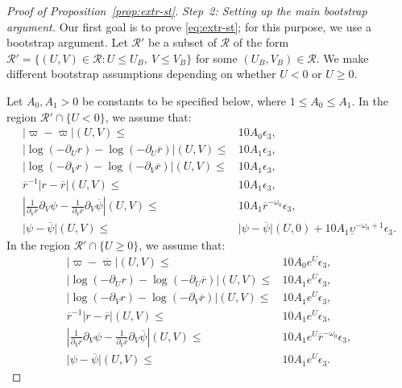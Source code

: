 \documentclass[10pt, reqno]{amsart}
\theoremstyle{definition}
\theoremstyle{remark}
\theoremstyle{conjecture}
\numberwithin{equation}{section}
\newcommand{\abs}[1]{\vert#1\vert}
\newcommand{\set}[1]{\{#1\}}
\newcommand{\rd}{\partial}
\newcommand{\0}{\emptyset}
\newcommand{\eps}{\epsilon}
\newcommand{\omg}{\omega}
\newcommand{\ups}{\upsilon}
\newcommand{\calR}{\mathcal R}
\newcommand{\pfstep}[1]{\vspace{.5em} {\it \noindent #1.}}
\newcommand{\psibg}{\overline{\psi}}				%
\newcommand{\rbg}{\overline{r}}					%
\newcommand{\varpibg}{\overline{\varpi}}				%
\newcommand{\Abs}[1]{\left\vert #1 \right\vert}
\begin{document}
\begin{proof}[Proof of Proposition~\ref{prop:extr-st}]
\pfstep{Step~2: Setting up the main bootstrap argument}
Our first goal is to prove \eqref{eq:extr-st}; for this purpose, we use a bootstrap argument. Let $\calR'$ be a subset of $\calR$ of the form $\calR' = \set{(U, V) \in \calR : U \leq U_{B}, \ V \leq V_{B}}$ for some $(U_{B}, V_{B}) \in \calR$. We make different bootstrap assumptions depending on whether $U < 0$ or $U \geq 0$. 

Let $A_{0}, A_{1} > 0$ be constants to be specified below, where $1 \leq A_{0} \leq A_{1}$. 
In the region $\calR' \cap \set{U < 0}$, we assume that:
\begin{align} 
	\abs{\varpi - \varpibg} (U, V) \leq & 10 A_{0} \eps_{3} , \label{eq:extr-st:btstrp:mdf-far} \\
	\Abs{\log (-\rd_{U} r) - \log (-\rd_{U} \rbg)} (U, V) \leq & 10 A_{1} \eps_{3} , \label{eq:extr-st:btstrp:durdf-far}\\
	\Abs{\log (-\rd_{V} r) - \log (-\rd_{V} \rbg)} (U, V) \leq & 10 A_{1} \eps_{3} , \label{eq:extr-st:btstrp:dvrdf-far}\\
	\rbg^{-1} \abs{r - \rbg} (U, V) \leq & 10 A_{1} \eps_{3} , \label{eq:extr-st:btstrp:rdf-far} \\
	\Abs{\frac{1}{\rd_{V} r} \rd_{V} \psi - \frac{1}{\rd_{V} \rbg} \rd_{V} \psibg} (U, V) \leq & 10 A_{1} \rbg^{-\omg_0} \eps_{3} , \label{eq:extr-st:btstrp:dvpsidf-far} \\
	\abs{\psi - \psibg} (U, V) \leq & \abs{\psi - \psibg} (U, 0) + 10 A_{1} \underline{\ups}^{-\omg_0 +1} \eps_{3}. \label{eq:extr-st:btstrp:psidf-far} 
\end{align}
In the region $\calR' \cap \set{U \geq 0}$, we assume that:
\begin{align} 
	\abs{\varpi - \varpibg} (U, V) \leq & 10 A_{0} e^{U} \eps_{3} , \label{eq:extr-st:btstrp:mdf} \\
	\Abs{\log (-\rd_{U} r) - \log (-\rd_{U} \rbg)} (U, V) \leq & 10 A_{1} e^{U} \eps_{3} , \label{eq:extr-st:btstrp:durdf}\\
	\Abs{\log (-\rd_{V} r) - \log (-\rd_{V} \rbg)} (U, V) \leq & 10 A_{1} e^{U} \eps_{3} , \label{eq:extr-st:btstrp:dvrdf}\\
	\rbg^{-1} \abs{r - \rbg} (U, V) \leq & 10 A_{1} e^{U} \eps_{3} , \label{eq:extr-st:btstrp:rdf} \\
	\Abs{\frac{1}{\rd_{V} r} \rd_{V} \psi - \frac{1}{\rd_{V} \rbg} \rd_{V} \psibg} (U, V) \leq & 10 A_{1} e^{U} \rbg^{-\omg_0} \eps_{3} , \label{eq:extr-st:btstrp:dvpsidf}  \\
	\abs{\psi - \psibg} (U, V) \leq & 10 A_{1} e^{U} \eps_{3}. \label{eq:extr-st:btstrp:psidf} 
\end{align}


\end{proof}
\end{document}
